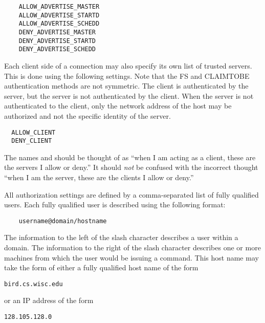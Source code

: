 \begin{verbatim}
    ALLOW_ADVERTISE_MASTER
    ALLOW_ADVERTISE_STARTD
    ALLOW_ADVERTISE_SCHEDD
    DENY_ADVERTISE_MASTER
    DENY_ADVERTISE_STARTD
    DENY_ADVERTISE_SCHEDD
\end{verbatim}


Each client side of a connection may also specify its own list of
trusted servers.  This is done using the following settings.  Note
that the FS and CLAIMTOBE authentication methods are not symmetric.
The client is authenticated by the server, but the server is not
authenticated by the client.  When the server is not authenticated to
the client, only the network address of the host may be authorized and
not the specific identity of the server.

\begin{verbatim}
  ALLOW_CLIENT
  DENY_CLIENT
\end{verbatim}

The names  and  should
be thought of as
``when I am acting as a client, these are the servers I allow or deny.''
It should \emph{not} be confused with the incorrect thought
``when I am the server, these are the clients I allow or deny.''

All authorization settings are defined by a comma-separated list of
fully qualified users.
Each fully qualified user
is described using the following format:
\begin{verbatim}
    username@domain/hostname
\end{verbatim}
The information to the left of the slash character describes
a user within a domain.
The information to the right of the slash character describes
one or more machines from which the user would be issuing a command. 
This host name may take the form of either a fully qualified host name
of the form
\begin{verbatim}
bird.cs.wisc.edu
\end{verbatim}
or an IP address
of the form
\begin{verbatim}
128.105.128.0
\end{verbatim}

